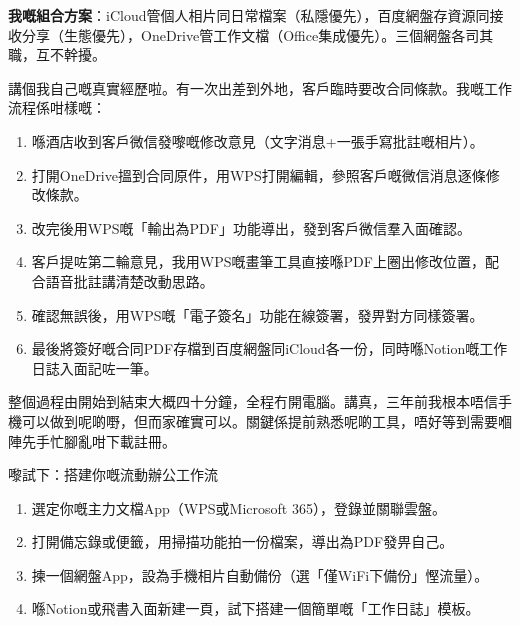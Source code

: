 \textbf{我嘅組合方案}：iCloud管個人相片同日常檔案（私隱優先），百度網盤存資源同接收分享（生態優先），OneDrive管工作文檔（Office集成優先）。三個網盤各司其職，互不幹擾。


講個我自己嘅真實經歷啦。有一次出差到外地，客戶臨時要改合同條款。我嘅工作流程係咁樣嘅：

\begin{enumerate}
  \item 喺酒店收到客戶微信發嚟嘅修改意見（文字消息+一張手寫批註嘅相片）。
  \item 打開OneDrive搵到合同原件，用WPS打開編輯，參照客戶嘅微信消息逐條修改條款。
  \item 改完後用WPS嘅「輸出為PDF」功能導出，發到客戶微信羣入面確認。
  \item 客戶提咗第二輪意見，我用WPS嘅畫筆工具直接喺PDF上圈出修改位置，配合語音批註講清楚改動思路。
  \item 確認無誤後，用WPS嘅「電子簽名」功能在線簽署，發畀對方同樣簽署。
  \item 最後將簽好嘅合同PDF存檔到百度網盤同iCloud各一份，同時喺Notion嘅工作日誌入面記咗一筆。
\end{enumerate}

整個過程由開始到結束大概四十分鐘，全程冇開電腦。講真，三年前我根本唔信手機可以做到呢啲嘢，但而家確實可以。關鍵係提前熟悉呢啲工具，唔好等到需要嗰陣先手忙腳亂咁下載註冊。

\begin{tcbpractice}{嚟試下：搭建你嘅流動辦公工作流}
\begin{enumerate}
  \item 選定你嘅主力文檔App（WPS或Microsoft 365），登錄並關聯雲盤。
  \item 打開備忘錄或便籤，用掃描功能拍一份檔案，導出為PDF發畀自己。
  \item 揀一個網盤App，設為手機相片自動備份（選「僅WiFi下備份」慳流量）。
  \item 喺Notion或飛書入面新建一頁，試下搭建一個簡單嘅「工作日誌」模板。
\end{enumerate}

\end{tcbpractice}
